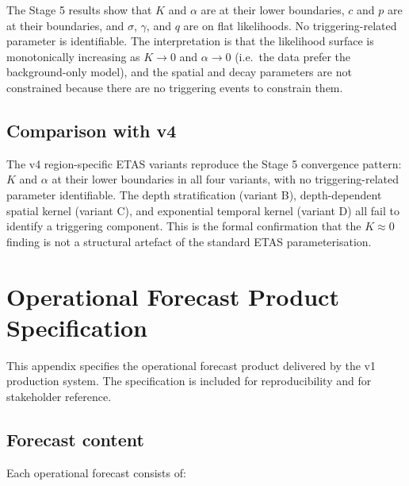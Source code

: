 \documentclass[10pt,a4paper,twocolumn]{article}
\begin{document}
The Stage 5 results show that $K$ and $\alpha$ are at their lower boundaries, $c$ and $p$ are at their boundaries, and $\sigma$, $\gamma$, and $q$ are on flat likelihoods. No triggering-related parameter is identifiable. The interpretation is that the likelihood surface is monotonically increasing as $K\to0$ and $\alpha\to0$ (i.e.\ the data prefer the background-only model), and the spatial and decay parameters are not constrained because there are no triggering events to constrain them.

\subsection{Comparison with v4}

The v4 region-specific ETAS variants reproduce the Stage 5 convergence pattern: $K$ and $\alpha$ at their lower boundaries in all four variants, with no triggering-related parameter identifiable. The depth stratification (variant B), depth-dependent spatial kernel (variant C), and exponential temporal kernel (variant D) all fail to identify a triggering component. This is the formal confirmation that the $K\approx0$ finding is not a structural artefact of the standard ETAS parameterisation.

\section{Operational Forecast Product Specification}\label{app:product-spec}

This appendix specifies the operational forecast product delivered by the v1 production system. The specification is included for reproducibility and for stakeholder reference.

\subsection{Forecast content}

Each operational forecast consists of:
\end{document}
